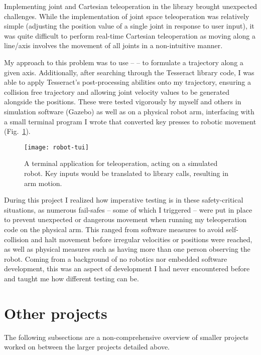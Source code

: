 Implementing joint and Cartesian teleoperation in the library brought unexpected challenges. While
the implementation of joint space teleoperation was relatively simple (adjusting the position value
of a single joint in response to user input), it was quite difficult to perform real-time Cartesian
teleoperation as moving along a line/axis involves the movement of all joints in a non-intuitive
manner.

My approach to this problem was to use  --  -- to formulate a trajectory along
a given axis. Additionally, after searching through the Tesseract library code, I was able to apply
Tesseract's post-processing abilities onto my trajectory, ensuring a collision free trajectory and
allowing joint velocity values to be generated alongside the  positions. These were tested
vigorously by myself and others in simulation software (Gazebo) as well as on a physical robot arm,
interfacing with a small terminal program I wrote that converted key presses to robotic movement
(Fig.~\ref{fig:robot-terminal}).

\begin{figure}
    \centering
    \texttt{[image: robot-tui]}
    \caption{A terminal application for teleoperation, acting on a simulated robot. Key inputs would
        be translated to library calls, resulting in arm motion.\label{fig:robot-terminal}}
\end{figure}

During this project I realized how imperative testing is in these safety-critical situations, as
numerous fail-safes -- some of which I triggered -- were put in place to prevent unexpected or dangerous
movement when running my teleoperation code on the physical arm. This ranged from software measures
to avoid self-collision and halt movement before irregular velocities or positions were reached, as
well as physical measures such as having more than one person observing the robot. Coming from a
background of no robotics nor embedded software development, this was an aspect of development I had
never encountered before and taught me how different testing can be.

\section{Other projects}

The following subsections are a non-comprehensive overview of smaller projects worked on between the
larger projects detailed above.

